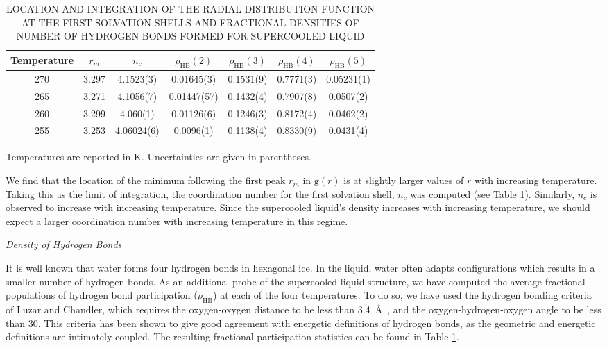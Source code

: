\begin{table}[h] \centering \caption{LOCATION AND INTEGRATION OF THE
    RADIAL DISTRIBUTION FUNCTION AT THE FIRST SOLVATION SHELLS AND
    FRACTIONAL DENSITIES OF NUMBER OF HYDROGEN BONDS FORMED FOR
    SUPERCOOLED LIQUID\label{tab:gofr}}
\begin{tabular}{ccccccc}
  \hline
  \hline
  Temperature & $r_m$ & $n_c$ & $\rho_\mathrm{HB}(2)$ & $\rho_\mathrm{HB}(3)$ & $\rho_\mathrm{HB}(4)$ & $\rho_\mathrm{HB}(5)$ \\
  \hline
  270 & 3.297 &4.1523(3) & 0.01645(3) & 0.1531(9) & 0.7771(3) & 0.05231(1)\\
  265 & 3.271 & 4.1056(7) & 0.01447(57) & 0.1432(4) & 0.7907(8) & 0.0507(2)\\
  260 & 3.299 & 4.060(1) & 0.01126(6) & 0.1246(3) & 0.8172(4) & 0.0462(2)\\
  255 & 3.253 & 4.06024(6)  & 0.0096(1) & 0.1138(4) & 0.8330(9) &
                                                                  0.0431(4) \\
  \hline
  \hline
\end{tabular}
\begin{flushleft}
Temperatures are reported in K. Uncertainties are given in parentheses.
\end{flushleft}
\end{table}

We find that the location of the minimum following the first peak
$r_m$ in $\mathrm{g}(r)$ is at slightly larger values of $r$ with
increasing temperature. Taking this as the limit of integration, the
coordination number for the first solvation shell, $n_c$ was computed
(see Table \ref{tab:gofr}). Similarly, $n_c$ is observed to increase with
increasing temperature. Since the supercooled liquid's density
increases with increasing temperature, we should expect a larger
coordination number with increasing temperature in this regime.

\begin{flushleft}
\textit{Density of Hydrogen Bonds}
\end{flushleft}

It is well known that water forms four hydrogen bonds in hexagonal
ice. In the liquid, water often adapts configurations which results in
a smaller number of hydrogen bonds. As an additional probe of the
supercooled liquid structure, we have computed the average fractional
populations of hydrogen bond participation ($\rho_\mathrm{HB}$) at
each of the four temperatures. To do so, we have used the hydrogen
bonding criteria of Luzar and Chandler, which requires the
oxygen-oxygen distance to be less than 3.4~\AA~, and the
oxygen-hydrogen-oxygen angle to be less than
30\degree.\cite{Luzar1996} This criteria has been shown to give good
agreement with energetic definitions of hydrogen bonds, as the
geometric and energetic definitions are intimately coupled. The
resulting fractional participation statistics can be found in Table
\ref{tab:gofr}.


